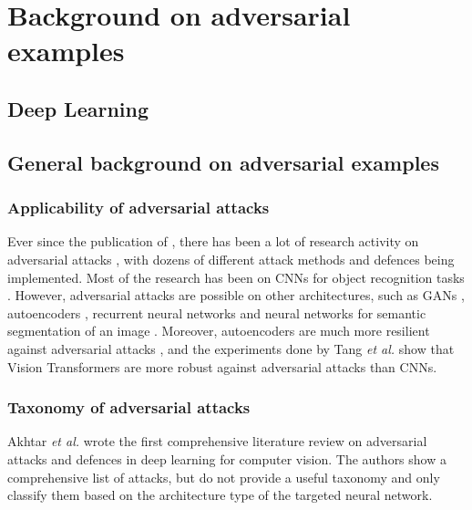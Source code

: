 \chapter{Background on adversarial examples}
	\label{chap:resources}
	
\section{Deep Learning}

\section{General background on adversarial examples}

\subsection{Applicability of adversarial attacks}
  
Ever since the publication of \cite{szegedy2014intriguing}, there has been a lot of research activity on adversarial attacks \cite{akhtar, silva_survey, tnnls_survey}, with dozens of different attack methods and defences being implemented. Most of the research has been on CNNs for object recognition tasks \cite{akhtar}. However, adversarial attacks are possible on other architectures, such as GANs \cite{kos_attacks_on_gans}, autoencoders \cite{tabacof_attacks_autoencoders}, recurrent neural networks \cite{papernot_attacks_rnns} and neural networks for semantic segmentation of an image \cite{Metzen_2017_ICCV}. Moreover, autoencoders are much more resilient against adversarial attacks \cite{tabacof_attacks_autoencoders}, and the experiments done by Tang \textit{et al.} \cite{robustart} show that Vision Transformers are more robust against adversarial attacks than CNNs.

\subsection{Taxonomy of adversarial attacks}

Akhtar \textit{et al.} \cite{akhtar} wrote the first comprehensive literature review on adversarial attacks and defences in deep learning for computer vision. The authors show a comprehensive list of attacks, but do not provide a useful taxonomy and only classify them based on the architecture type of the targeted neural network. 

